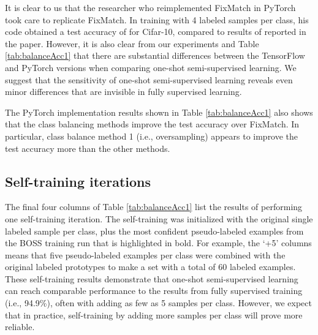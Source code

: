 \documentclass[final]{cvpr}
\newcommand{\OSSSL}{one-shot semi-supervised learning }
\newcommand{\OSSSLno}{one-shot semi-supervised learning}
\begin{document}
It is clear to us that the researcher who reimplemented FixMatch in PyTorch took care to replicate FixMatch.
In training with 4 labeled samples per class, his code obtained a test accuracy of  for Cifar-10, compared to results of  reported in the paper.
However, it is also clear from our experiments and Table \ref{tab:balanceAcc1} that there are substantial differences between the TensorFlow and PyTorch versions when comparing \OSSSLno.
We suggest that the sensitivity of \OSSSL reveals even minor differences that are invisible in fully supervised learning.

The PyTorch implementation results shown in Table \ref{tab:balanceAcc1} also shows that the class balancing methods improve the test accuracy over FixMatch.
In particular, class balance method 1 (i.e., oversampling) appears to improve the test accuracy more than the other methods.


\subsection{Self-training iterations}
\label{sec:expIter}

The final four columns of Table \ref{tab:balanceAcc1} list the results of performing one self-training iteration.
The self-training was initialized with the  original single labeled sample per class, plus  the most confident pseudo-labeled examples from the BOSS training run that is highlighted in bold.
For example, the `+5' columns means that five pseudo-labeled examples per class were combined with the original labeled prototypes to make a set with a total of 60 labeled examples.
These self-training results demonstrate that \OSSSL can reach comparable performance to the results from fully supervised training (i.e., 94.9\%), often with adding as few as 5 samples per class.
However, we expect that in practice, self-training by adding more samples per class will prove more reliable.
\end{document}
